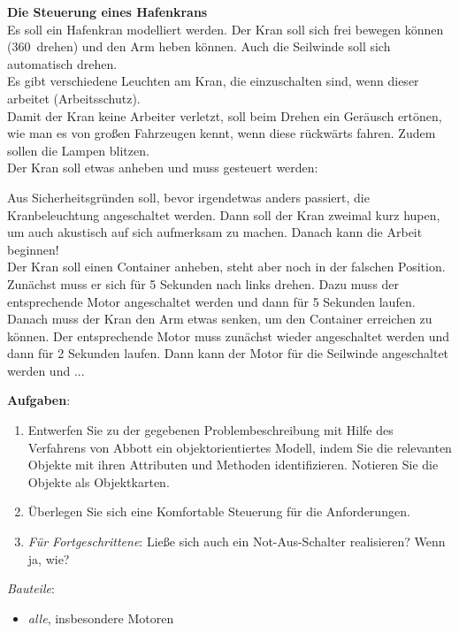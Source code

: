 \documentclass[11pt, a4paper]{article}
\begin{document}
\textbf{{\Large Die Steuerung eines Hafenkrans}}\\


Es soll ein Hafenkran modelliert werden. Der Kran soll sich frei bewegen können (360\textdegree~drehen) und den Arm heben können. Auch die Seilwinde soll sich automatisch drehen.\\

Es gibt verschiedene Leuchten am Kran, die einzuschalten sind, wenn dieser arbeitet (Arbeitsschutz).\\

Damit der Kran keine Arbeiter verletzt, soll beim Drehen ein Geräusch ertönen, wie man es von großen Fahrzeugen kennt, wenn diese rückwärts fahren. Zudem sollen die Lampen blitzen.\\

Der Kran soll etwas anheben und muss gesteuert werden:

\begin{mdframed}
Aus Sicherheitsgründen soll, bevor irgendetwas anders passiert, die Kranbeleuchtung angeschaltet werden. Dann soll der Kran zweimal kurz hupen, um auch akustisch auf sich aufmerksam zu machen. Danach kann die Arbeit beginnen!\\

Der Kran soll einen Container anheben, steht aber noch in der falschen Position. Zunächst muss er sich für 5 Sekunden nach links drehen. Dazu muss der entsprechende Motor angeschaltet werden und dann für 5 Sekunden laufen. Danach muss der Kran den Arm etwas senken, um den Container erreichen zu können. Der entsprechende Motor muss zunächst wieder angeschaltet werden und dann für 2 Sekunden laufen. Dann kann der Motor für die Seilwinde angeschaltet werden und ...
\end{mdframed}


\vspace{0.5cm}
\textbf{Aufgaben}:
\begin{enumerate}
\item Entwerfen Sie zu der gegebenen Problembeschreibung mit Hilfe des Verfahrens von Abbott ein objektorientiertes Modell, indem Sie die relevanten Objekte mit ihren Attributen und Methoden identifizieren. Notieren Sie die Objekte als Objektkarten.

\item Überlegen Sie sich eine Komfortable Steuerung für die Anforderungen. 

\item \emph{Für Fortgeschrittene}: Ließe sich auch ein Not-Aus-Schalter realisieren? Wenn ja, wie?
\end{enumerate}

\vfill
\emph{Bauteile}:
\begin{itemize}
\item \emph{alle}, insbesondere Motoren
\end{itemize}
\end{document}
